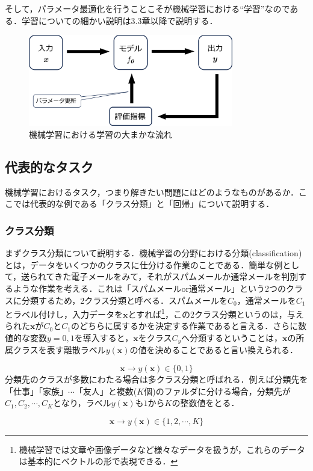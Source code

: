 \documentclass[a4paper,11pt]{jsreport}
\begin{document}
そして，パラメータ最適化を行うことこそが機械学習における``学習''なのである．学習についての細かい説明は3.3章以降で説明する．
\begin{figure}[H]
  \begin{center}
    \includegraphics[height=4cm]{image/機械学習概要図.png}
    \caption{機械学習における学習の大まかな流れ}
    \label{機械学習の大まかな流れ}
  \end{center}
\end{figure}

\subsection{代表的なタスク}
機械学習におけるタスク，つまり解きたい問題にはどのようなものがあるか．ここでは代表的な例である「クラス分類」と「回帰」について説明する．
\subsubsection*{クラス分類}
まずクラス分類について説明する．機械学習の分野における分類(classification)とは，データをいくつかのクラスに仕分ける作業のことである．簡単な例として，送られてきた電子メールをみて，それがスパムメールか通常メールを判別するような作業を考える．これは「スパムメールor通常メール」という2つのクラスに分類するため，2クラス分類と呼べる．スパムメールを$C_0$，通常メールを$C_1$とラベル付けし，入力データを$\bm{x}$とすれば\footnote{機械学習では文章や画像データなど様々なデータを扱うが，これらのデータは基本的にベクトルの形で表現できる．}，この2クラス分類というのは，与えられた$\bm{x}$が$C_0$と$C_1$のどちらに属するかを決定する作業であると言える．さらに数値的な変数$y = 0, 1$を導入すると，$\bm{x}$をクラス$C_{y}$へ分類するということは，$\bm{x}$の所属クラスを表す離散ラベル$y(\bm{x})$の値を決めることであると言い換えられる．\par
\begin{equation}
  \bm{x} \longrightarrow y(\bm{x}) \in \{0, 1\}
\end{equation}
分類先のクラスが多数にわたる場合は多クラス分類と呼ばれる．例えば分類先を「仕事」「家族」$\cdots$「友人」と複数($K$個)のファルダに分ける場合，分類先が$C_1,C_2,\cdots,C_K$となり，ラベル$y(\bm{x})$も$1$から$K$の整数値をとる．\par
\begin{equation}
  \bm{x} \longrightarrow y(\bm{x}) \in \{1, 2, \cdots, K\}
\end{equation}
\end{document}
